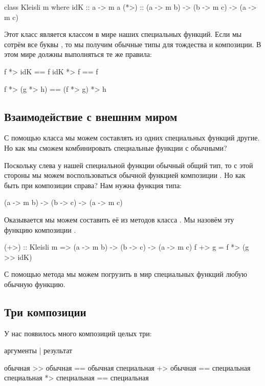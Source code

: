 \begin{code}
class Kleisli m where
    idK  :: a -> m a
    (*>) :: (a -> m b) -> (b -> m c) -> (a -> m c)    
\end{code}

Этот класс является классом  в мире наших 
специальных функций. Если мы сотрём все буквы ,
то мы получим обычные типы для тождества и композиции.
В этом мире должны выполняться те же правила:

\begin{code}
f   *> idK  == f
idK *> f    == f

f *> (g *> h) == (f *> g) *> h
\end{code}

\subsection{Взаимодействие с внешним миром}

С помощью класса  мы можем составлять из одних 
специальных функций другие. Но как мы сможем комбинировать
специальные функции с обычными?

Поскольку слева у нашей специальной функции обычный общий тип, 
то с этой стороны мы можем воспользоваться обычной функцией
композиции \In{>>}. Но как быть при композиции справа?
Нам нужна функция типа:

\begin{code}
(a -> m b) -> (b -> c) -> (a -> m c)
\end{code}

Оказывается мы можем составить её из методов класса .
Мы назовём эту функцию композиции \In{(+>)}.

\begin{code}
(+>) :: Kleisli m => (a -> m b) -> (b -> c) -> (a -> m c)
f +> g = f *> (g >> idK)
\end{code}

С помощью метода  мы можем погрузить в мир специальных
функций любую обычную функцию. 

\subsection{Три композиции}

У нас появилось много композиций целых три:

\begin{code}
аргументы                           |   результат 

обычная         >>  обычная         ==  обычная
специальная     +>  обычная         ==  специальная
специальная     *>  специальная     ==  специальная
\end{code}

